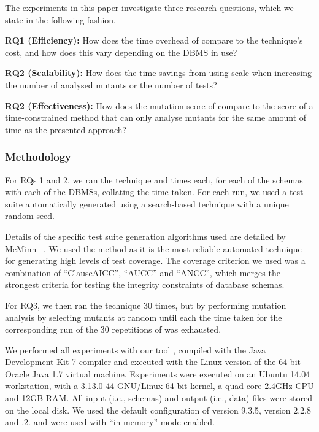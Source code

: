 The experiments in this paper investigate three research questions, which we state in the following fashion.

\vspace{5pt}

\textbf{RQ1 (Efficiency):} How does the time overhead of \VMA compare to the \Standard technique's cost, and how does
this vary depending on the DBMS in use?

\vspace{5pt}

\textbf{RQ2 (Scalability):} How does the time savings from using \VMA scale when increasing the number of analysed mutants
or the number of tests?

\vspace{5pt}

\textbf{RQ2 (Effectiveness):} How does the mutation score of \VMA compare to the score of a time-constrained method that
can only analyse mutants for the same amount of time as the presented approach?

\subsubsection{Methodology}
\label{sec:methodology}
For RQs 1 and 2, we ran the \Original technique and  times each, for each of the schemas with each of the DBMSs, collating the time taken. For each run, we used a test suite automatically generated using a search-based technique with a unique random seed.

Details of the specific test suite generation algorithms used are detailed by McMinn \etal~\cite{McMinn2015}. We used the \AVM method as it is the most reliable automated technique for generating high levels of test coverage. The coverage criterion we used was a combination of ``ClauseAICC'', ``AUCC'' and ``ANCC'', which merges the strongest criteria for testing the integrity constraints of database schemas.

For RQ3, we then ran the \Original technique 30 times, but by performing mutation analysis by selecting mutants at random until each the time taken for the corresponding run of the 30 repetitions of \vma was exhausted.

We performed all experiments with our \SA tool \cite{Kapfhammer2013,Wright2014,McMinn2015},
compiled with the Java Development Kit 7 compiler and executed with the Linux version of the 64-bit Oracle Java 1.7 virtual machine. Experiments were executed on an Ubuntu 14.04 workstation, with a 3.13.0-44 GNU/Linux 64-bit kernel, a quad-core 2.4GHz CPU and 12GB RAM. All input (i.e., schemas) and output (i.e., data) files were stored on the local disk. We used the default configuration of \PostgreSQL version 9.3.5, \HyperSQL version 2.2.8 and .2. \HyperSQL and \SQLite were used with ``in-memory'' mode enabled.

